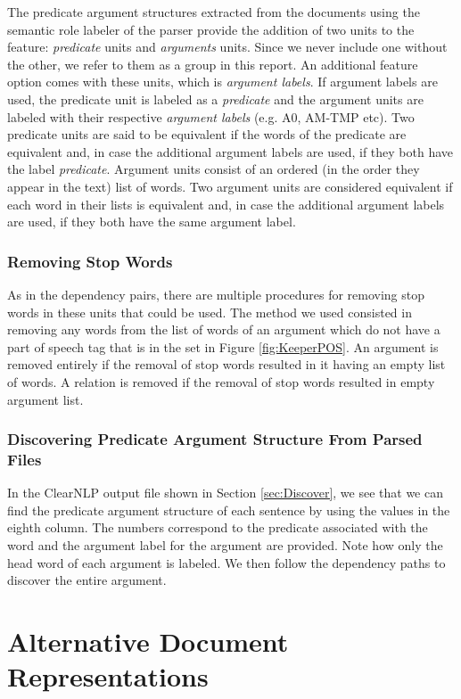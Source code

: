 \documentclass[11pt]{article}
\begin{document}
The predicate argument structures extracted from the documents using the semantic role labeler of the parser provide the addition of two units to the feature: \textit{predicate} units and \textit{arguments} units. Since we never include one without the other, we refer to them as a group in this report. An additional feature option comes with these units, which is \textit{argument labels}. If argument labels are used, the predicate unit is labeled as a \emph{predicate} and the argument units are labeled with their respective \emph{argument labels} (e.g. A0, AM-TMP etc). Two predicate units are said to be equivalent if the words of the predicate are equivalent and, in case the additional argument labels are used, if they both have the label \emph{predicate}. Argument units consist of an ordered (in the order they appear in the text) list of words. Two argument units are considered equivalent if each word in their lists is equivalent and, in case 
the additional argument labels are used, if they both have the same argument label. 

\subsubsection{Removing Stop Words}

As in the dependency pairs, there are multiple procedures for removing stop words in these units that could be used. The method we used consisted in removing any words from the list of words of an argument which do not have a part of speech tag that is in the set in Figure \ref{fig:KeeperPOS}. An argument is removed entirely if the removal of stop words resulted in it having an empty list of words. A relation is removed if the removal of stop words resulted in empty argument list. 

\subsubsection{Discovering Predicate Argument Structure From Parsed Files} 

In the ClearNLP output file shown in Section \ref{sec:Discover}, we see that we can find the predicate argument structure of each sentence by using the values in the eighth column. The numbers correspond to the predicate associated with the word and the argument label for the argument are provided. Note how only the head word of each argument is labeled. We then follow the dependency paths to discover the entire argument. 

\section{Alternative Document Representations}
\end{document}
